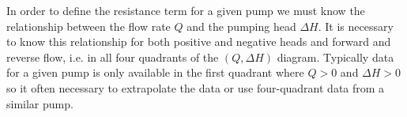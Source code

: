 \documentclass[12pt]{article}
\begin{document}
\begin{comment}

The head increase due to the action of a pump is given by a polynomial, typically quadratic, function of the flow rate such that
\begin{align}
\Delta H = c_0 + c_1 Q + c_2 Q^2 + \ldots = \sum_{i=0}^n c_i Q^i,
\end{align}
where $c_0, \ldots, c_n$ are constant coefficients and $n$ is the degree of the polynomial. 

For a given pump the constant coefficients $c_i$ are specified at the rated pump configuration. If $Q_r, \Delta H_r, N_r, D_r$ are the rated flow rate, head increase, rotational speed and impeller diameter respectively then the pump affinity laws give the relations 
\begin{align}
\frac{Q}{Q_r} = \left( \frac{N}{N_r} \right) \left( \frac{D}{D_r} \right) = \xi, \hspace{0.5cm} \frac{\Delta H}{\Delta H_r} = \left( \frac{N}{N_r} \right)^2 \left( \frac{D}{D_r} \right)^2 = \xi^2.
\end{align} 
These relationships may then be used to determine the polynomial function when different rotational speeds and impeller diameters are used since 
\begin{align}
\Delta H =& \xi^2 \Delta H_r = \xi^2 \left[ c_0 + c_1 Q_r + c_2 Q_r^2 + \ldots \right] \nonumber \\ =& \xi^2 \left[ c_0 + c_1 \xi^{-1} Q + c_2 \xi^{-2} Q^2 + \ldots \right] \nonumber \\ =& c_0' + c_1' Q + c_2' Q^2 + \ldots
\end{align}
where $c_i' = \xi^2 c_i \xi^{-i} = \xi^{2-i} c_i$ are the corrected coefficients due to the affinity laws. 

Since pumps, unlike pipes and valves, give an increase in head for positive flows the resistance term for pumps may be written as
\begin{align}\label{pump_resistance}
\boxed{ R_j = \sum_{i=0}^n c_i' Q_j^i, }
\end{align}
where 
\begin{align}
c_i' = \left( \frac{N D}{N_r D_r} \right)^{2-i} c_i
\end{align}
and $c_i$ are the rated pump coefficients. 

\end{comment}

In order to define the resistance term for a given pump we must know the relationship between the flow rate $Q$ and the pumping head $\Delta H$. It is necessary to know this relationship for both positive and negative heads and forward and reverse flow, i.e. in all four quadrants of the $(Q,\Delta H)$ diagram. Typically data for a given pump is only available in the first quadrant where $Q>0$ and $\Delta H > 0$ so it often necessary to extrapolate the data or use four-quadrant data from a similar pump. 
\end{document}
